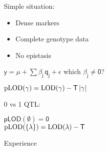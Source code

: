 \documentclass[12pt]{article}
\newcommand{\headsize}{\fontsize{35}{35} \selectfont}
\newcommand{\smallersize}{\fontsize{20}{25} \selectfont}
\newcommand{\smallestsize}{\fontsize{18}{22} \selectfont}
\newcommand{\lod}{\text{LOD}}
\newcommand{\plod}{\text{pLOD}}
\begin{document}
\hfill \begin{minipage}{10in}

Simple situation:

{\smallestsize
\color{myblue}
\begin{itemize}
\item Dense markers
\item Complete genotype data
\item No epistasis

\end{itemize} }

\vspace{2cm}

\centerline{
$\mathsf{y  = \mu + \sum \beta_j \, q_j + \epsilon}$ \hspace{1cm}
       {\color{mypink} which $\mathsf{\beta_j \ne 0}$?}
}

\vspace{2cm}

{\color{myyellow}
$\mathsf{ \plod(\gamma) = \lod(\gamma) -
    {\color{mypink} T} \, |\gamma| }$
}

\vspace{2cm}

\begin{minipage}[t]{1.4in}
\vspace*{0mm}

0 vs 1 QTL:
\end{minipage}
\begin{minipage}[t]{6in}
\vspace*{0mm}

\color{myblue}
$\mathsf{\plod(\emptyset) = 0}$ \\[16pt]
$\mathsf{\plod(\{\lambda\}) =
    \lod(\lambda) - {\color{mypink} T}}$
\end{minipage}


\end{minipage}






\newpage

\headsize \color{myyellow}
\hfill \begin{minipage}{5.75in}
\centering
Experience
\end{minipage}

\vspace{3cm} \color{mywhite} \smallersize
\end{document}
